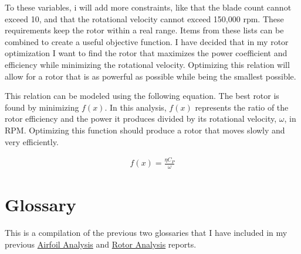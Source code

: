 \documentclass{article}
\begin{document}
To these variables, i will add more constraints, like that the blade count cannot exceed 10, and that the rotational velocity cannot exceed 150,000 rpm. These requirements keep the rotor within a real range. Items from these lists can be combined to create a useful objective function. I have decided that in my rotor optimization I want to find the rotor that maximizes the power coefficient and efficiency while minimizing the rotational velocity. Optimizing this relation will allow for a rotor that is as powerful as possible while being the smallest possible.

This relation can be modeled using the following equation. The best rotor is found by minimizing $f(x)$. In this analysis, $f(x)$ represents the ratio of the rotor efficiency and the power it produces divided by its rotational velocity, $\omega$, in RPM. Optimizing this function should produce a rotor that moves slowly and very efficiently.

\begin{equation}
\begin{aligned}
	f(x) = \frac{\eta C_{P}}{\omega}
\end{aligned}
\end{equation}

\clearpage

\section{Glossary}

This is a compilation of the previous two glossaries that I have included in my previous \href{https://github.com/JoeSpencer1/497R-Projects/blob/Rotor-Analysis/Airfoil Analysis/Airfoil_Analysis.pdf}{Airfoil Analysis} and \href{https://github.com/JoeSpencer1/497R-Projects/blob/Rotor-Analysis/Rotor Analysis/Rotor_Analysis.pdf}{Rotor Analysis} reports.
\end{document}
